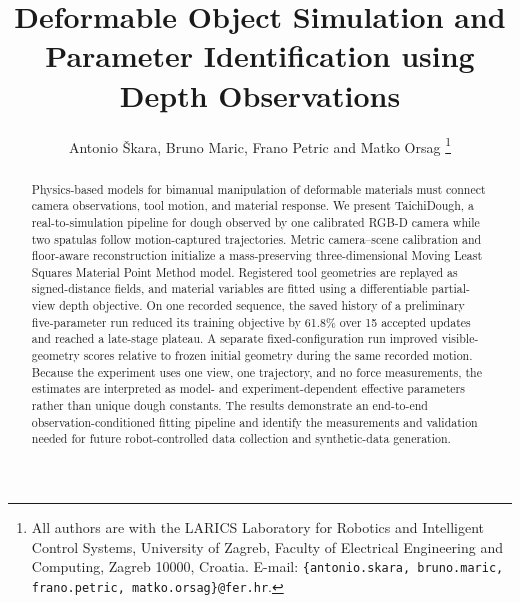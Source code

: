 \documentclass[letterpaper,10pt,conference]{ieeeconf}
\author{Antonio Škara, Bruno Maric, Frano Petric and Matko Orsag%
\thanks{All authors are with the LARICS Laboratory for Robotics and Intelligent Control Systems, University of Zagreb, Faculty of Electrical Engineering and Computing, Zagreb 10000, Croatia. E-mail: \texttt{\{antonio.skara, bruno.maric, frano.petric, matko.orsag\}@fer.hr}.}}
\title{Deformable Object Simulation and Parameter Identification using Depth Observations}
\begin{document}
\maketitle

\begin{abstract}
Physics-based models for bimanual manipulation of deformable materials must connect camera observations, tool motion, and material response. We present TaichiDough, a real-to-simulation pipeline for dough observed by one calibrated RGB-D camera while two spatulas follow motion-captured trajectories. Metric camera--scene calibration and floor-aware reconstruction initialize a mass-preserving three-dimensional Moving Least Squares Material Point Method model. Registered tool geometries are replayed as signed-distance fields, and material variables are fitted using a differentiable partial-view depth objective. On one recorded sequence, the saved history of a preliminary five-parameter run reduced its training objective by 61.8\% over 15 accepted updates and reached a late-stage plateau. A separate fixed-configuration run improved visible-geometry scores relative to frozen initial geometry during the same recorded motion. Because the experiment uses one view, one trajectory, and no force measurements, the estimates are interpreted as model- and experiment-dependent effective parameters rather than unique dough constants. The results demonstrate an end-to-end observation-conditioned fitting pipeline and identify the measurements and validation needed for future robot-controlled data collection and synthetic-data generation.
\end{abstract}








\end{document}
